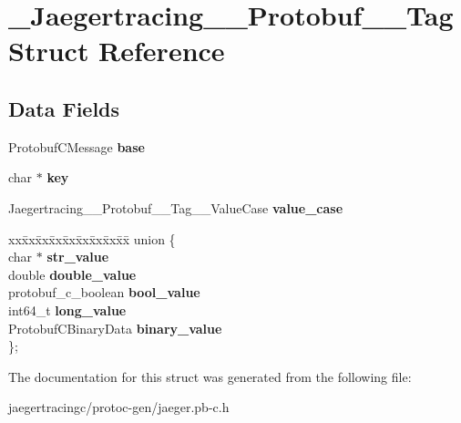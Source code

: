 \hypertarget{struct__Jaegertracing____Protobuf____Tag}{}\section{\+\_\+\+Jaegertracing\+\_\+\+\_\+\+Protobuf\+\_\+\+\_\+\+Tag Struct Reference}
\label{struct__Jaegertracing____Protobuf____Tag}
\subsection*{Data Fields}
\begin{DoxyCompactItemize}
\item 
\mbox{\label{struct__Jaegertracing____Protobuf____Tag_a5083777cfc630087e26728b68718c770}} 
Protobuf\+C\+Message {\bfseries base}
\item 
\mbox{\label{struct__Jaegertracing____Protobuf____Tag_a3ae221578bff2b92ee29a14bfb7400be}} 
char $\ast$ {\bfseries key}
\item 
\mbox{\label{struct__Jaegertracing____Protobuf____Tag_a191aadd4272a839677f3e9aa09524623}} 
Jaegertracing\+\_\+\+\_\+\+Protobuf\+\_\+\+\_\+\+Tag\+\_\+\+\_\+\+Value\+Case {\bfseries value\+\_\+case}
\item 
\mbox{\label{struct__Jaegertracing____Protobuf____Tag_ab776beb7bf63c2e99057d1284a0b8e6a}} 
\begin{tabbing}
xx\=xx\=xx\=xx\=xx\=xx\=xx\=xx\=xx\=\kill
union \{\\
\>char $\ast$ {\bfseries str\_value}\\
\>double {\bfseries double\_value}\\
\>protobuf\_c\_boolean {\bfseries bool\_value}\\
\>int64\_t {\bfseries long\_value}\\
\>ProtobufCBinaryData {\bfseries binary\_value}\\
\}; \\

\end{tabbing}\end{DoxyCompactItemize}


The documentation for this struct was generated from the following file\+:\begin{DoxyCompactItemize}
\item 
jaegertracingc/protoc-\/gen/jaeger.\+pb-\/c.\+h\end{DoxyCompactItemize}
